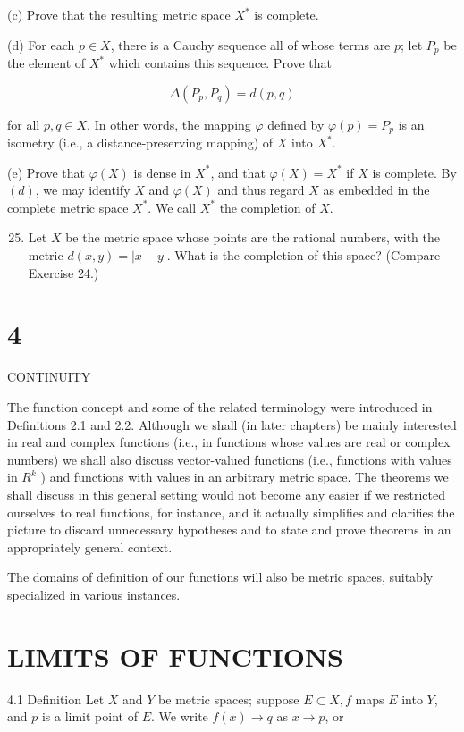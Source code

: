 \documentclass[10pt]{article}
\begin{document}
(c) Prove that the resulting metric space $X^{*}$ is complete.

(d) For each $p \in X$, there is a Cauchy sequence all of whose terms are $p$; let $P_{p}$ be the element of $X^{*}$ which contains this sequence. Prove that

$$
\Delta\left(P_{p}, P_{q}\right)=d(p, q)
$$

for all $p, q \in X$. In other words, the mapping $\varphi$ defined by $\varphi(p)=P_{p}$ is an isometry (i.e., a distance-preserving mapping) of $X$ into $X^{*}$.

(e) Prove that $\varphi(X)$ is dense in $X^{*}$, and that $\varphi(X)=X^{*}$ if $X$ is complete. By $(d)$, we may identify $X$ and $\varphi(X)$ and thus regard $X$ as embedded in the complete metric space $X^{*}$. We call $X^{*}$ the completion of $X$.

\begin{enumerate}
  \setcounter{enumi}{24}
  \item Let $X$ be the metric space whose points are the rational numbers, with the metric $d(x, y)=|x-y|$. What is the completion of this space? (Compare Exercise 24.)
\end{enumerate}

\section{4}
CONTINUITY

The function concept and some of the related terminology were introduced in Definitions 2.1 and 2.2. Although we shall (in later chapters) be mainly interested in real and complex functions (i.e., in functions whose values are real or complex numbers) we shall also discuss vector-valued functions (i.e., functions with values in $R^{k}$ ) and functions with values in an arbitrary metric space. The theorems we shall discuss in this general setting would not become any easier if we restricted ourselves to real functions, for instance, and it actually simplifies and clarifies the picture to discard unnecessary hypotheses and to state and prove theorems in an appropriately general context.

The domains of definition of our functions will also be metric spaces, suitably specialized in various instances.

\section{LIMITS OF FUNCTIONS}
4.1 Definition Let $X$ and $Y$ be metric spaces; suppose $E \subset X, f$ maps $E$ into $Y$, and $p$ is a limit point of $E$. We write $f(x) \rightarrow q$ as $x \rightarrow p$, or
\end{document}
